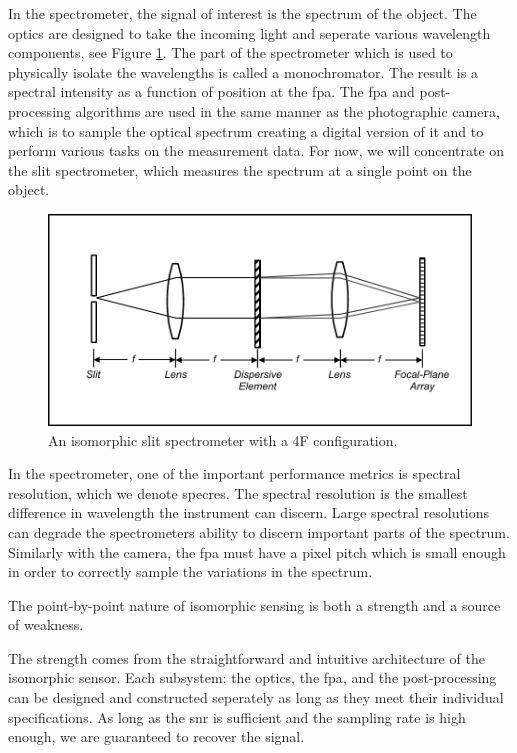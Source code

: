 In the spectrometer, the signal of interest is the spectrum of the object. The optics are designed to take the incoming light and seperate various wavelength components, see Figure \ref{fig:slitspectrometer}. The part of the spectrometer which is used to physically isolate the wavelengths is called a \gls{monochromator}. The result is a spectral intensity as a function of position at the \gls{fpa}. The \gls{fpa} and post-processing algorithms are used in the same manner as the photographic camera, which is to sample the optical spectrum creating a digital version of it and to perform various tasks on the measurement data. For now, we will concentrate on the slit spectrometer, which measures the spectrum at a single point on the object.


\begin{figure}
    \centering
    \includegraphics[scale=1]{slitspectrometer}
    \caption{An isomorphic slit spectrometer with a 4F configuration.}
    \label{fig:slitspectrometer}
\end{figure}

In the spectrometer, one of the important performance metrics is \gls{spectral resolution}, which we denote \gls{specres}. The spectral resolution is the smallest difference in wavelength the instrument can discern. Large spectral resolutions can degrade the spectrometers ability to discern important parts of the spectrum. Similarly with the camera, the \gls{fpa} must have a \gls{pixel pitch} which is small enough in order to correctly sample the variations in the spectrum. 

The point-by-point nature of isomorphic sensing is both a strength and a source of weakness. 

The strength comes from the straightforward and intuitive architecture of the isomorphic sensor. Each subsystem: the optics, the \acrfull{fpa}, and the post-processing can be designed and constructed seperately as long as they meet their individual specifications. As long as the \gls{snr} is sufficient and the sampling rate is high enough, we are guaranteed to recover the signal.

